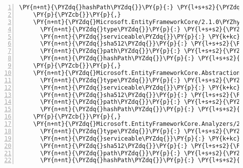 \begin{Verbatim}[commandchars=\\\{\},numbers=left,firstnumber=1,stepnumber=1,numberblanklines=0]
      \PY{n+nt}{\PYZdq{}hashPath\PYZdq{}}\PY{p}{:} \PY{l+s+s2}{\PYZdq{}microsoft.dotnet.platformabstractions.2.1.0\PYZhy{}rc1.nupkg.sha512\PYZdq{}}
    \PY{p}{\PYZcb{}}\PY{p}{,}
    \PY{n+nt}{\PYZdq{}Microsoft.EntityFrameworkCore/2.1.0\PYZhy{}rc1\PYZhy{}final\PYZdq{}}\PY{p}{:} \PY{p}{\PYZob{}}
      \PY{n+nt}{\PYZdq{}type\PYZdq{}}\PY{p}{:} \PY{l+s+s2}{\PYZdq{}package\PYZdq{}}\PY{p}{,}
      \PY{n+nt}{\PYZdq{}serviceable\PYZdq{}}\PY{p}{:} \PY{k+kc}{true}\PY{p}{,}
      \PY{n+nt}{\PYZdq{}sha512\PYZdq{}}\PY{p}{:} \PY{l+s+s2}{\PYZdq{}sha512\PYZhy{}EcMsTF6D/NxsZcgikG30WBjwPESmHayIcLf+bJuvM1+wmCR46Jpol0WRAbIn9ieCvdwpvx++f8T3xIcbTtb+WQ==\PYZdq{}}\PY{p}{,}
      \PY{n+nt}{\PYZdq{}path\PYZdq{}}\PY{p}{:} \PY{l+s+s2}{\PYZdq{}microsoft.entityframeworkcore/2.1.0\PYZhy{}rc1\PYZhy{}final\PYZdq{}}\PY{p}{,}
      \PY{n+nt}{\PYZdq{}hashPath\PYZdq{}}\PY{p}{:} \PY{l+s+s2}{\PYZdq{}microsoft.entityframeworkcore.2.1.0\PYZhy{}rc1\PYZhy{}final.nupkg.sha512\PYZdq{}}
    \PY{p}{\PYZcb{}}\PY{p}{,}
    \PY{n+nt}{\PYZdq{}Microsoft.EntityFrameworkCore.Abstractions/2.1.0\PYZhy{}rc1\PYZhy{}final\PYZdq{}}\PY{p}{:} \PY{p}{\PYZob{}}
      \PY{n+nt}{\PYZdq{}type\PYZdq{}}\PY{p}{:} \PY{l+s+s2}{\PYZdq{}package\PYZdq{}}\PY{p}{,}
      \PY{n+nt}{\PYZdq{}serviceable\PYZdq{}}\PY{p}{:} \PY{k+kc}{true}\PY{p}{,}
      \PY{n+nt}{\PYZdq{}sha512\PYZdq{}}\PY{p}{:} \PY{l+s+s2}{\PYZdq{}sha512\PYZhy{}QsgPQwJo9LCu5Iuto4pBKRxeceE2eGVsJDJ+j/DAc/TN7s42FKUPY7qLLFTt4PfbsNS/rI57qTWIYxvPbLIDTA==\PYZdq{}}\PY{p}{,}
      \PY{n+nt}{\PYZdq{}path\PYZdq{}}\PY{p}{:} \PY{l+s+s2}{\PYZdq{}microsoft.entityframeworkcore.abstractions/2.1.0\PYZhy{}rc1\PYZhy{}final\PYZdq{}}\PY{p}{,}
      \PY{n+nt}{\PYZdq{}hashPath\PYZdq{}}\PY{p}{:} \PY{l+s+s2}{\PYZdq{}microsoft.entityframeworkcore.abstractions.2.1.0\PYZhy{}rc1\PYZhy{}final.nupkg.sha512\PYZdq{}}
    \PY{p}{\PYZcb{}}\PY{p}{,}
    \PY{n+nt}{\PYZdq{}Microsoft.EntityFrameworkCore.Analyzers/2.1.0\PYZhy{}rc1\PYZhy{}final\PYZdq{}}\PY{p}{:} \PY{p}{\PYZob{}}
      \PY{n+nt}{\PYZdq{}type\PYZdq{}}\PY{p}{:} \PY{l+s+s2}{\PYZdq{}package\PYZdq{}}\PY{p}{,}
      \PY{n+nt}{\PYZdq{}serviceable\PYZdq{}}\PY{p}{:} \PY{k+kc}{true}\PY{p}{,}
      \PY{n+nt}{\PYZdq{}sha512\PYZdq{}}\PY{p}{:} \PY{l+s+s2}{\PYZdq{}sha512\PYZhy{}41fgA9caAZr53sd0acYHviekmB7qrD1cOMLIAV8ZWlNoUMBB/A85nLqyacMvuzJK9A/Qmd/S1/H2zmLI2gX4bQ==\PYZdq{}}\PY{p}{,}
      \PY{n+nt}{\PYZdq{}path\PYZdq{}}\PY{p}{:} \PY{l+s+s2}{\PYZdq{}microsoft.entityframeworkcore.analyzers/2.1.0\PYZhy{}rc1\PYZhy{}final\PYZdq{}}\PY{p}{,}
      \PY{n+nt}{\PYZdq{}hashPath\PYZdq{}}\PY{p}{:} \PY{l+s+s2}{\PYZdq{}microsoft.entityframeworkcore.analyzers.2.1.0\PYZhy{}rc1\PYZhy{}final.nupkg.sha512\PYZdq{}}

\end{Verbatim}
